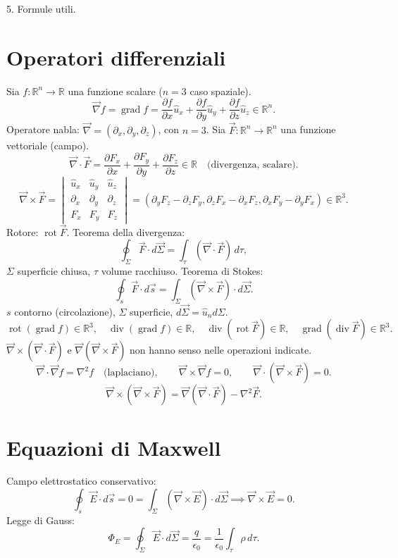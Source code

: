\documentclass[11pt,a4paper]{article}
\newcommand{\pagina}[1]{\clearpage}
\newcommand{\vv}[1]{\vec{#1}}
\begin{document}
5. Formule utili.
\pagina{2}\section*{Operatori differenziali}
Sia $f:\mathbb R^n\to\mathbb R$ una funzione scalare ($n=3$ caso spaziale).
\[\vv\nabla f=\operatorname{grad}f=\frac{\partial f}{\partial x}\hat u_x+\frac{\partial f}{\partial y}\hat u_y+\frac{\partial f}{\partial z}\hat u_z\in\mathbb R^n.\]
Operatore nabla: $\vv\nabla=(\partial_x,\partial_y,\partial_z)$, con $n=3$.
Sia $\vv F:\mathbb R^n\to\mathbb R^n$ una funzione vettoriale (campo).
\[\vv\nabla\cdot\vv F=\frac{\partial F_x}{\partial x}+\frac{\partial F_y}{\partial y}+\frac{\partial F_z}{\partial z}\in\mathbb R\quad\text{(divergenza, scalare)}.\]
\[\vv\nabla\times\vv F=\begin{vmatrix}\hat u_x&\hat u_y&\hat u_z\\\partial_x&\partial_y&\partial_z\\F_x&F_y&F_z\end{vmatrix}
=\left(\partial_yF_z-\partial_zF_y,\partial_zF_x-\partial_xF_z,\partial_xF_y-\partial_yF_x\right)\in\mathbb R^3.\]
Rotore: $\operatorname{rot}\vv F$. Teorema della divergenza:
\[\oint_\Sigma\vv F\cdot d\vv\Sigma=\int_\tau(\vv\nabla\cdot\vv F)\,d\tau,\]
$\Sigma$ superficie chiusa, $\tau$ volume racchiuso. Teorema di Stokes:
\[\oint_s\vv F\cdot d\vv s=\int_\Sigma(\vv\nabla\times\vv F)\cdot d\vv\Sigma.\]
$s$ contorno (circolazione), $\Sigma$ superficie, $d\vv\Sigma=\hat u_n d\Sigma$.
\[\operatorname{rot}(\operatorname{grad}f)\in\mathbb R^3,\quad\operatorname{div}(\operatorname{grad}f)\in\mathbb R,\quad\operatorname{div}(\operatorname{rot}\vv F)\in\mathbb R,\quad\operatorname{grad}(\operatorname{div}\vv F)\in\mathbb R^3.\]
$\vv\nabla\times(\vv\nabla\cdot\vv F)$ e $\vv\nabla(\vv\nabla\times\vv F)$ non hanno senso nelle operazioni indicate.
\[\vv\nabla\cdot\vv\nabla f=\nabla^2f\quad\text{(laplaciano)},\qquad\vv\nabla\times\vv\nabla f=0,\qquad\vv\nabla\cdot(\vv\nabla\times\vv F)=0.\]
\[\vv\nabla\times(\vv\nabla\times\vv F)=\vv\nabla(\vv\nabla\cdot\vv F)-\nabla^2\vv F.\]
\pagina{3}\section*{Equazioni di Maxwell}
Campo elettrostatico conservativo:
\[\oint_s\vv E\cdot d\vv s=0=\int_\Sigma(\vv\nabla\times\vv E)\cdot d\vv\Sigma\implies\vv\nabla\times\vv E=0.\]
Legge di Gauss:
\[\Phi_E=\oint_\Sigma\vv E\cdot d\vv\Sigma=\frac{q}{\epsilon_0}=\frac1{\epsilon_0}\int_\tau\rho\,d\tau.\]
\end{document}
